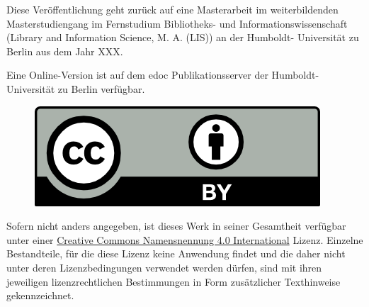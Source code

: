 \documentclass[paper=a4,11pt,twoside,parskip=half-]{scrreprt} %
\begin{document}
\vspace*{\fill}
Diese Veröffentlichung geht zurück auf eine Masterarbeit im weiterbildenden Ma\-ster\-stu\-di\-en\-gang im Fernstudium Bibliotheks- und Informationswissenschaft (\foreignlanguage{english}{Library and Information Science}, M. A. (LIS)) an der Humboldt- Universität zu Berlin aus dem Jahr XXX.\par
%
%
%
%
Eine Online-Version ist auf dem edoc Publikationsserver der Humboldt-Universität zu Berlin verfügbar. \par

\begin{figure}
\vspace{-.481cm}
\includegraphics[scale=.7]{by.png}
\end{figure}

\small  Sofern nicht anders angegeben, ist dieses Werk in seiner Gesamtheit verfügbar unter einer \href{https://creativecommons.org/licenses/by/4.0/}{\foreignlanguage{english}{Creative Commons} Namensnennung 4.0 International} Lizenz. %
Einzelne Bestandteile, für die diese Lizenz keine Anwendung findet und die daher nicht unter deren Lizenzbedingungen verwendet werden dürfen, sind mit ihren jeweiligen lizenzrechtlichen Bestimmungen in Form zusätzlicher Texthinweise gekennzeichnet. 
\end{document}
